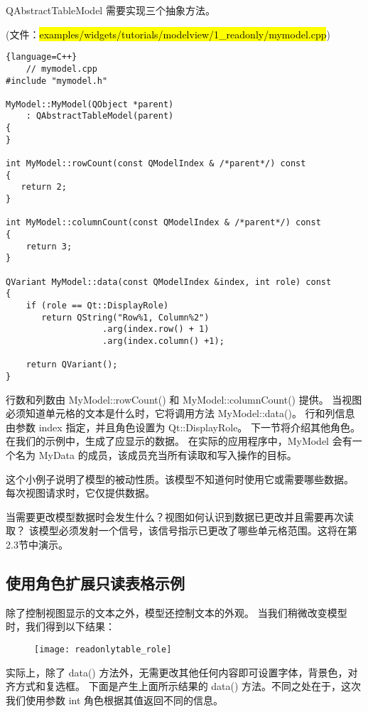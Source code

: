 QAbstractTableModel 需要实现三个抽象方法。

(文件：\hl{examples/widgets/tutorials/modelview/1\_readonly/mymodel.cpp})

\begin{lstlisting}{language=C++}
	// mymodel.cpp
#include "mymodel.h"

MyModel::MyModel(QObject *parent)
    : QAbstractTableModel(parent)
{
}

int MyModel::rowCount(const QModelIndex & /*parent*/) const
{
   return 2;
}

int MyModel::columnCount(const QModelIndex & /*parent*/) const
{
    return 3;
}

QVariant MyModel::data(const QModelIndex &index, int role) const
{
    if (role == Qt::DisplayRole)
       return QString("Row%1, Column%2")
                   .arg(index.row() + 1)
                   .arg(index.column() +1);

    return QVariant();
}
\end{lstlisting}


行数和列数由 MyModel::rowCount() 和 MyModel::columnCount() 提供。
当视图必须知道单元格的文本是什么时，它将调用方法 MyModel::data()。
行和列信息由参数 index 指定，并且角色设置为 Qt::DisplayRole。
下一节将介绍其他角色。在我们的示例中，生成了应显示的数据。
在实际的应用程序中，MyModel 会有一个名为 MyData 的成员，该成员充当所有读取和写入操作的目标。

这个小例子说明了模型的被动性质。该模型不知道何时使用它或需要哪些数据。
每次视图请求时，它仅提供数据。

当需要更改模型数据时会发生什么？视图如何认识到数据已更改并且需要再次读取？
该模型必须发射一个信号，该信号指示已更改了哪些单元格范围。这将在第2.3节中演示。

\subsection{使用角色扩展只读表格示例}

除了控制视图显示的文本之外，模型还控制文本的外观。
当我们稍微改变模型时，我们得到以下结果：

\begin{figure}[hbt!]  
\texttt{[image: readonlytable\_role]}
\end{figure}

实际上，除了 data() 方法外，无需更改其他任何内容即可设置字体，背景色，对齐方式和复选框。
下面是产生上面所示结果的 data() 方法。不同之处在于，这次我们使用参数 int 角色根据其值返回不同的信息。

